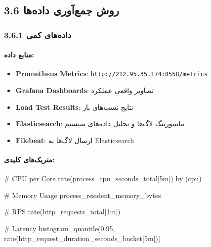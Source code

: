 \documentclass[
]{article}
\newenvironment{Shaded}{}{}
\newcommand{\NormalTok}[1]{#1}
\providecommand{\tightlist}{%
  \setlength{\itemsep}{0pt}\setlength{\parskip}{0pt}}
\begin{document}
\subsection{3.6 روش جمع‌آوری
داده‌ها}\label{ux631ux648ux634-ux62cux645ux639ux622ux648ux631ux6cc-ux62fux627ux62fux647ux647ux627}

\subsubsection{3.6.1 داده‌های
کمی}\label{ux62fux627ux62fux647ux647ux627ux6cc-ux6a9ux645ux6cc}

\paragraph{منابع
داده:}\label{ux645ux646ux627ux628ux639-ux62fux627ux62fux647}

\begin{itemize}
\tightlist
\item
  \textbf{Prometheus Metrics}:
  \texttt{http://212.95.35.174:8558/metrics}
\item
  \textbf{Grafana Dashboards}: تصاویر واقعی عملکرد
\item
  \textbf{Load Test Results}: نتایج تست‌های بار
\item
  \textbf{Elasticsearch}: مانیتورینگ لاگ‌ها و تحلیل داده‌های سیستم
\item
  \textbf{Filebeat}: ارسال لاگ‌ها به Elasticsearch
\end{itemize}

\paragraph{متریک‌های
کلیدی:}\label{ux645ux62aux631ux6ccux6a9ux647ux627ux6cc-ux6a9ux644ux6ccux62fux6cc-1}

\begin{Shaded}
\begin{Highlighting}[]
\NormalTok{\# CPU per Core}
\NormalTok{rate(process\_cpu\_seconds\_total[5m]) by (cpu)}

\NormalTok{\# Memory Usage}
\NormalTok{process\_resident\_memory\_bytes}

\NormalTok{\# RPS}
\NormalTok{rate(http\_requests\_total[1m])}

\NormalTok{\# Latency}
\NormalTok{histogram\_quantile(0.95, rate(http\_request\_duration\_seconds\_bucket[5m]))}
\end{Highlighting}
\end{Shaded}
\end{document}
